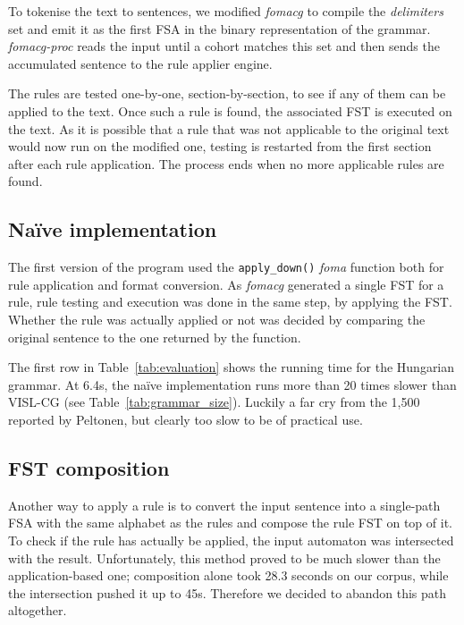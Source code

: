 \documentclass[11pt]{article}
\begin{document}
To tokenise the text to sentences, we modified \emph{fomacg} to compile the
\emph{delimiters} set and emit it as the first FSA in the binary representation
of the grammar. \emph{fomacg-proc} reads the input until a cohort matches this
set and then sends the accumulated sentence to the rule applier engine.

The rules are tested one-by-one, section-by-section, to see if any of them can
be applied to the text. Once such a rule is found, the associated FST is
executed on the text. As it is possible that a rule that was not applicable to
the original text would now run on the modified one, testing is restarted from the
first section after each rule application. The process ends when no more
applicable rules are found.

\subsection{Naïve implementation}
\label{sec:speed_naive}

The first version of the program used the \texttt{apply\_down()} \emph{foma}
function both for rule application and format conversion. As \emph{fomacg}
generated a single FST for a rule, rule testing and execution was done in the
same step, by applying the FST. Whether the rule was actually applied or not was
decided by comparing the original sentence to the one returned by the function.

The first row in Table~\ref{tab:evaluation} shows the running time for the
Hungarian grammar. At 6.4s, the naïve implementation runs more than 20 times
slower than VISL-CG (see Table~\ref{tab:grammar_size}). Luckily a far cry from
the 1,500 reported by Peltonen, but clearly too slow to be of practical use.

\subsection{FST composition}
\label{sec:speed_composition}

Another way to apply a rule is to convert the input sentence into a
single-path FSA with the same alphabet as the rules and compose the rule FST
on top of it. To check if the rule has actually be applied, the input
automaton was intersected with the result. Unfortunately, this method proved to
be much slower than the application-based one; composition alone took 28.3
seconds on our corpus, while the intersection pushed it up to 45s. Therefore we
decided to abandon this path altogether.
\end{document}
